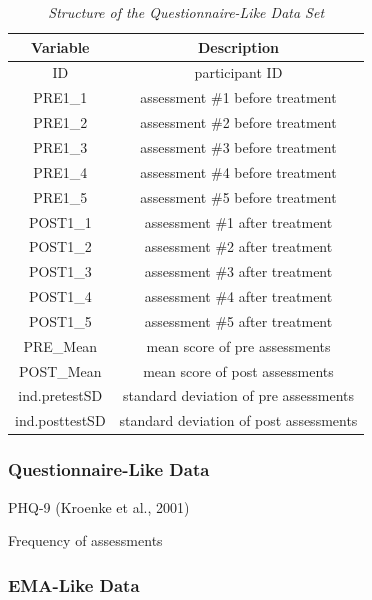 \documentclass[12pt,twoside]{reedthesis}
\begin{document}
\par
\begin{table}[htb]
\vspace*{1.5em}
\begin{threeparttable}
  \caption{\textit{Structure of the Questionnaire-Like Data Set}}
  \label{tab:quest-str}
  \begin{tabular}{@{}cc@{}}
  \toprule
  Variable & Description\\ \midrule
  ID & participant ID\\
  PRE1\_1 & assessment \#1 before treatment\\
  PRE1\_2 & assessment \#2 before treatment\\
  PRE1\_3 & assessment \#3 before treatment\\
  PRE1\_4 & assessment \#4 before treatment\\
  PRE1\_5 & assessment \#5 before treatment\\
  POST1\_1 & assessment \#1 after treatment\\
  POST1\_2 & assessment \#2 after treatment\\
  POST1\_3 & assessment \#3 after treatment\\
  POST1\_4 & assessment \#4 after treatment\\
  POST1\_5 & assessment \#5 after treatment\\
  PRE\_Mean & mean score of pre assessments\\
  POST\_Mean & mean score of post assessments\\
  ind.pretestSD & standard deviation of pre assessments\\
  ind.posttestSD & standard deviation of post assessments\\
  \bottomrule
  \end{tabular}
\end{threeparttable}
\end{table}
\hypertarget{questionnaire-like-data}{%
\subsubsection{Questionnaire-Like Data}\label{questionnaire-like-data}}

PHQ-9 (Kroenke et al., 2001)

Frequency of assessments

\hypertarget{ema-like-data}{%
\subsubsection{EMA-Like Data}\label{ema-like-data}}
\end{document}

